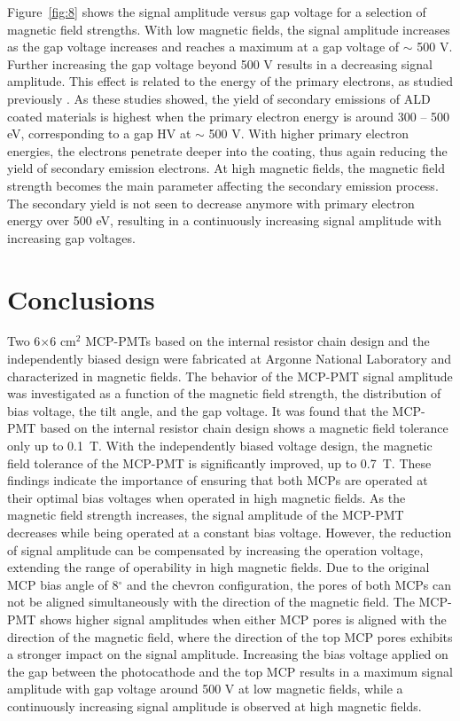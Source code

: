 \documentclass[preprint,5p]{elsarticle}
\begin{document}
Figure~\ref{fig:8} shows the signal amplitude versus gap voltage for a selection of magnetic 
field strengths. With low magnetic fields, the signal 
amplitude increases as the gap voltage increases and reaches a maximum at a gap 
voltage of $\sim$ 500 V. 
Further increasing the gap voltage beyond 500 V results in a decreasing signal amplitude.
 This effect is related to the energy of the primary electrons, as studied previously \cite{22}. 
As these studies showed, the yield of secondary emissions of ALD coated materials is highest
when the primary electron energy is around 300 – 500 eV, corresponding to a gap HV at $\sim$ 500 V.
With higher primary electron energies, the electrons penetrate deeper into the coating, thus  
again reducing the yield of secondary emission electrons.
At high magnetic fields, 
the magnetic field strength becomes the main parameter affecting the secondary 
emission process. 
The secondary yield is not seen to 
decrease anymore with primary electron energy over 500 eV, resulting in a 
continuously increasing signal amplitude with increasing gap voltages.

\section{Conclusions}
Two 6$\times$6 cm$^2$ MCP-PMTs based on the internal resistor chain design and 
the independently biased design were fabricated at Argonne National Laboratory and 
characterized in magnetic fields. The behavior of 
the MCP-PMT signal amplitude was investigated as a function of the magnetic 
field strength, the distribution of bias voltage, the tilt angle, and the gap 
voltage. It was found that the MCP-PMT based on the internal resistor chain design 
shows a magnetic field tolerance only up to 0.1~T. With the independently biased voltage 
design, the magnetic field tolerance of the MCP-PMT is significantly improved,
up to 0.7~T. 
These findings indicate the importance of ensuring that both MCPs are operated at their 
optimal bias 
voltages when operated in high magnetic fields. As the magnetic field 
strength increases, the signal amplitude of the MCP-PMT decreases while being operated 
at a constant bias voltage.
However, the reduction of signal amplitude can be compensated 
by increasing the operation voltage, extending the range of operability in 
high magnetic fields. Due to the original MCP bias angle of 8$^{\circ}$ and 
the chevron configuration, the pores of both MCPs can not be aligned simultaneously with the direction of 
the magnetic field. The MCP-PMT shows higher signal amplitudes when either 
MCP pores is aligned with the direction of the magnetic field, where the 
direction of the top MCP pores exhibits a stronger impact on the signal amplitude.
Increasing the bias voltage applied on the gap between the photocathode and the top MCP results in 
a maximum signal amplitude with gap voltage around 500 V at low magnetic 
fields, while a continuously increasing signal amplitude is observed at high magnetic 
fields. 
\end{document}
